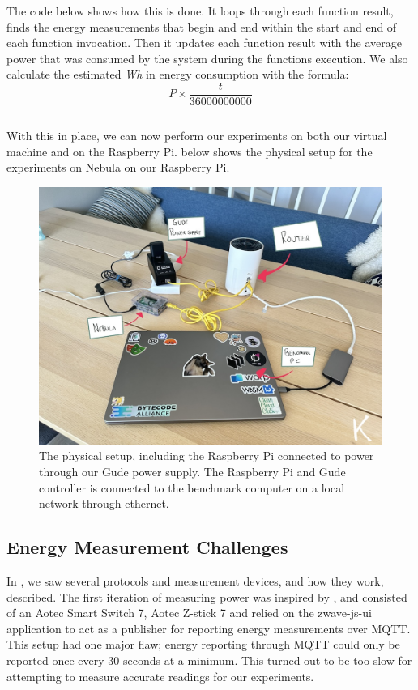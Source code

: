 \documentclass[
  table]{report}
\begin{document}
The code below shows how this is done. It loops through each function
result, finds the energy measurements that begin and end within the
start and end of each function invocation. Then it updates each function
result with the average power that was consumed by the system during the
functions execution. We also calculate the estimated \emph{Wh} in energy
consumption with the formula: \[P \times
\frac{t}{36000000000}\]

\inputminted{rust}{assets/code/pair_power_data.rs}

With this in place, we can now perform our experiments on both our
virtual machine and on the Raspberry Pi.  below
shows the physical setup for the experiments on Nebula on our Raspberry
Pi.

\begin{figure}[H]
\centering
  \includegraphics{assets/6-physical_setup.jpg}
  \caption{The physical setup, including the Raspberry Pi connected to power
through our Gude power supply. The Raspberry Pi and Gude controller is connected
to the benchmark computer on a local network through ethernet.}
  \label{fig:physical_setup}
\end{figure}

\subsection{Energy Measurement Challenges}
\label{sect:energy_challenges}

In , we saw several protocols and
measurement devices, and how they work, described. The first iteration
of measuring power was inspired by
\citet{qianEnergyFootprintingWordPress2022}, and consisted of an Aotec
Smart Switch 7, Aotec Z-stick 7 and relied on the zwave-js-ui
application to act as a publisher for reporting energy measurements over
\ac{MQTT}. This setup had one major flaw; energy reporting through
\ac{MQTT} could only be reported once every 30 seconds at a minimum.
This turned out to be too slow for attempting to measure accurate
readings for our experiments.
\end{document}
